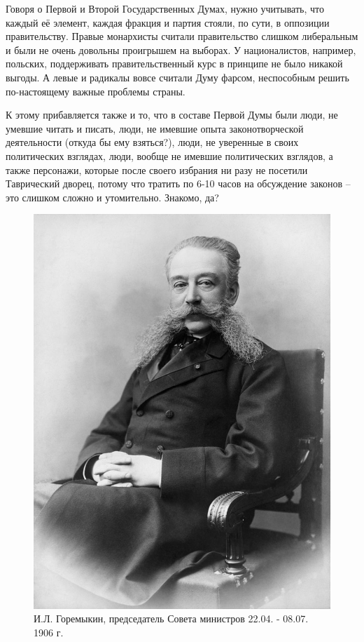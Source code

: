 Говоря о Первой и Второй Государственных Думах, нужно учитывать, что каждый её элемент, каждая фракция и партия стояли, по сути, в оппозиции правительству. Правые монархисты считали правительство слишком либеральным и были не очень довольны проигрышем на выборах. У националистов, например, польских, поддерживать правительственный курс в принципе не было никакой выгоды. А левые и радикалы вовсе считали Думу фарсом, неспособным решить по-настоящему важные проблемы страны.

К этому прибавляется также и то, что в составе Первой Думы были люди, не умевшие читать и писать, люди, не имевшие опыта законотворческой деятельности (откуда бы ему взяться?), люди, не уверенные в своих политических взглядах, люди, вообще не имевшие политических взглядов, а также персонажи, которые после своего избрания ни разу не посетили Таврический дворец, потому что тратить по 6-10 часов на обсуждение законов – это слишком сложно и утомительно. Знакомо, да?

\begin{figure}[h!tb] 
	\centering\includegraphics[scale=0.3]{Data/Vybory_V_Dumu/-dKq-zNIERM.jpg}
	\caption{И.Л. Горемыкин, председатель Совета министров 22.04. - 08.07. 1906 г.}%
\end{figure}

